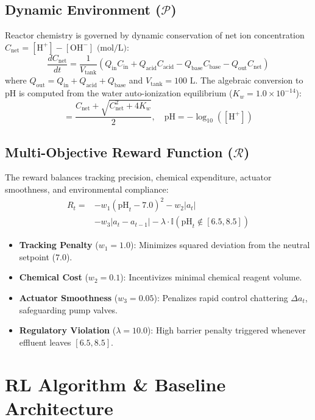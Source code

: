 \documentclass[10pt,twocolumn,a4paper]{article}
\begin{document}
\subsection{Dynamic Environment ($\mathcal{P}$)}
Reactor chemistry is governed by dynamic conservation of net ion concentration $C_{\text{net}} = [\text{H}^+] - [\text{OH}^-] \text{ (mol/L)}$:
\begin{equation}
\frac{dC_{\text{net}}}{dt} = \frac{1}{V_{\text{tank}}} \left( Q_{\text{in}} C_{\text{in}} + Q_{\text{acid}} C_{\text{acid}} - Q_{\text{base}} C_{\text{base}} - Q_{\text{out}} C_{\text{net}} \right)
\end{equation}
where $Q_{\text{out}} = Q_{\text{in}} + Q_{\text{acid}} + Q_{\text{base}}$ and $V_{\text{tank}} = 100\text{ L}$.
The algebraic conversion to pH is computed from the water auto-ionization equilibrium ($K_w = 1.0 \times 10^{-14}$):
\begin{equation}
[\text{H}^+] = \frac{C_{\text{net}} + \sqrt{C_{\text{net}}^2 + 4K_w}}{2}, \quad \text{pH} = -\log_{10}([\text{H}^+])
\end{equation}

\subsection{Multi-Objective Reward Function ($\mathcal{R}$)}
The reward balances tracking precision, chemical expenditure, actuator smoothness, and environmental compliance:
\begin{align}
R_t = & - w_1 (\text{pH}_t - 7.0)^2 - w_2 |a_t| \nonumber \\
      & - w_3 |a_t - a_{t-1}| - \lambda \cdot \mathbb{I}(\text{pH}_t \notin [6.5, 8.5])
\end{align}
\begin{itemize}
    \item \textbf{Tracking Penalty} ($w_1 = 1.0$): Minimizes squared deviation from the neutral setpoint ($7.0$).
    \item \textbf{Chemical Cost} ($w_2 = 0.1$): Incentivizes minimal chemical reagent volume.
    \item \textbf{Actuator Smoothness} ($w_3 = 0.05$): Penalizes rapid control chattering $\Delta a_t$, safeguarding pump valves.
    \item \textbf{Regulatory Violation} ($\lambda = 10.0$): High barrier penalty triggered whenever effluent leaves $[6.5, 8.5]$.
\end{itemize}

\section{RL Algorithm \& Baseline Architecture}
\end{document}
